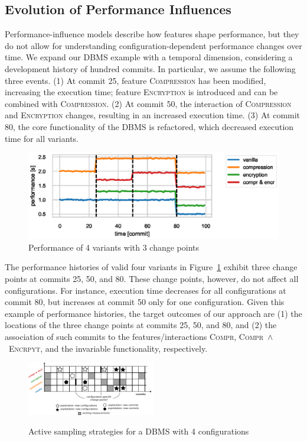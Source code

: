\documentclass[sigconf]{acmart}
\begin{document}
	\subsection{Evolution of Performance Influences}
	Performance-influence models describe how features shape performance, but they do not allow for understanding configuration-dependent performance changes over time.
	We expand our DBMS example with a temporal dimension, considering a development history of hundred commits.
	In particular, we assume the following three events. (1) At commit 25, feature \textsc{Compression} has been modified, increasing the execution time; feature \textsc{Encryption} is introduced and can be combined with \textsc{Compression}. (2) At commit 50, the interaction of \textsc{Compression} and \textsc{Encryption} changes, resulting in an increased execution time. (3) At commit 80, the core functionality of the DBMS is refactored, which decreased execution time for all variants.
	\begin{figure}[ht!]
		\centering
		\includegraphics[width=\linewidth]{images/dbms_performance.eps}
		\caption{Performance of 4 variants with 3 change points}
		\label{fig:dbms_performance}
	\end{figure}
	
	The performance histories of valid four variants in Figure~\ref{fig:dbms_performance} exhibit three change points at commits 25, 50, and 80. These change points, however, do not affect all configurations.
	For  instance, execution time decreases for all configurations at commit 80, but increases at commit 50 only for one configuration.
	Given this example of performance histories, the target outcomes of our approach are (1) the locations of the three change points at commits 25, 50, and 80, and (2) the association of such commits to the features/interactions \textsc{Compr}, \textsc{Compr\ $\land$\ Encrpyt}, and the invariable functionality, respectively.
	
	\begin{figure}
		\includegraphics[width=0.5\textwidth]{images/sampling_plan}
		\label{fig:sampling plan}
		\caption{Active sampling strategies for a DBMS with 4 configurations}
	\end{figure}
	
\end{document}
